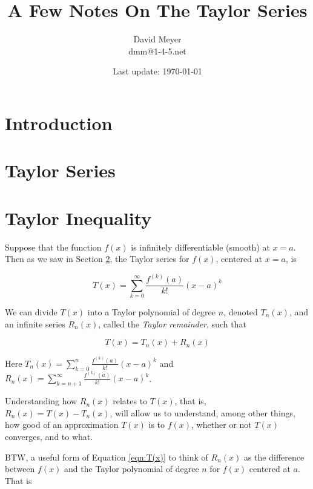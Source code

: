 \documentclass[11pt, oneside]{article}   	%
\title{A Few Notes On The Taylor Series}
\author{David Meyer \\ dmm@1-4-5.net}
\date{Last update: \today}							%
\theoremstyle{definition}
\theoremstyle{definition}
\theoremstyle{remark}
\begin{document}
\maketitle

\section{Introduction}

\section{Taylor Series}
\label{sec:taylor_series}

\section{Taylor Inequality}
Suppose that the function $f(x)$ is infinitely differentiable (smooth) at $x=a$. Then as we saw in Section \ref{sec:taylor_series}, 
the Taylor series for $f(x)$, centered at $x=a$, is

\medskip
\begin{equation}
T(x) = \sum\limits _{k=0}^{\infty}{\frac {f^{(k)}(a)}{k!}}(x-a)^{k}
\label{eqn:taylor_series}
\end{equation}


\bigskip
\noindent
We can divide $T(x)$ into a Taylor polynomial of degree $n$,  denoted $T_n(x)$,  and an infinite series $R_n(x)$, called the \emph{Taylor remainder}, such that  

\medskip
\begin{equation}
T(x) = T_n(x) + R_n(x)
\label{eqn:T(x)}
\end{equation}

\bigskip
\noindent
Here  $T_n(x) =  \sum\limits _{k=0}^{n}{\frac {f^{(k)}(a)}{k!}}(x-a)^{k}$ and  $R_n(x) =  \!\! \sum\limits _{k=n+1}^{\infty}{\frac {f^{(k)}(a)}{k!}}(x-a)^{k}$. 

\bigskip
\noindent
Understanding how $R_n(x)$ relates to $T(x)$, that is, $R_n(x) = T(x) - T_n(x)$,  will allow us to understand, among other things, 
how good of an approximation $T(x)$ is to $f(x)$, whether or not $T(x)$ converges,  and to what.

\bigskip
\noindent
BTW, a useful form of Equation \ref{eqn:T(x)} to think of $R_n(x)$ as the difference between $f(x)$ and the Taylor
polynomial of degree $n$ for $f(x)$ centered at $a$. That is
\end{document}
